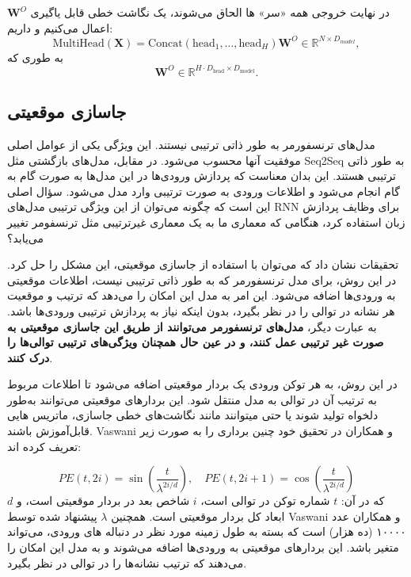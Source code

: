 در نهایت خروجی همه «سر» ها الحاق می‌شوند، یک نگاشت خطی قابل یاگیری
$\mathbf{W}^O$
اعمال می‌کنیم و داریم:
$$
\text{MultiHead}(\mathbf{X}) = \text{Concat}(\text{head}_1, \dots, \text{head}_H) \mathbf{W}^O \in \mathbb{R}^{N \times D_{model}},
$$
به طوری که
$$
\mathbf{W}^O \in \mathbb{R}^{H \cdot D_{\text{head}} \times D_{\text{model}}}.
$$

\subsection{جاسازی موقعیتی}

مدل‌های ترنسفورمر به طور ذاتی ترتیبی نیستند. این ویژگی یکی از عوامل اصلی موفقیت آنها محسوب می‌شود. در مقابل، مدل‌های بازگشتی مثل Seq2Seq به طور ذاتی ترتیبی هستند. این بدان معناست که پردازش ورودی‌ها در این مدل‌ها به صورت گام به گام انجام می‌شود و اطلاعات ورودی به صورت ترتیبی وارد مدل می‌شود. سؤال اصلی این است که چگونه می‌توان از این ویژگی ترتیبی مدل‌های RNN برای وظایف پردازش زبان استفاده کرد، هنگامی که معماری ما به یک معماری غیرترتیبی مثل ترنسفومر تغییر می‌یابد؟

تحقیقات نشان داد که می‌توان با استفاده از جاسازی موقعیتی، این مشکل را حل کرد. در این روش، برای مدل ترنسفورمر که به طور ذاتی ترتیبی نیست، اطلاعات موقعیتی به ورودی‌ها اضافه می‌شود. این امر به مدل این امکان را می‌دهد که ترتیب و موقعیت هر نشانه در توالی را در نظر بگیرد، بدون اینکه نیاز به پردازش ترتیبی ورودی‌ها باشد. به عبارت دیگر، \textbf{مدل‌های ترنسفورمر می‌توانند از طریق این جاسازی موقعیتی به صورت غیر ترتیبی عمل کنند، و در عین حال همچنان ویژگی‌های ترتیبی توالی‌ها را درک کنند}.

در این روش، به هر توکن ورودی یک بردار موقعیتی اضافه می‌شود تا اطلاعات مربوط به ترتیب آن در توالی به مدل منتقل شود. این بردارهای موقعیتی می‌توانند به‌طور دلخواه تولید شوند یا حتی میتوانند مانند نگاشت‌های خطی جاسازی، ماتریس هایی قابل‌آموزش باشند. Vaswani و همکاران در تحقیق خود چنین برداری را  به صورت زیر تعریف کرده اند:

\begin{equation}
PE(t, 2i) = \sin\left( \frac{t}{\lambda^{2i/d}} \right), \quad PE(t, 2i+1) = \cos\left( \frac{t}{\lambda^{2i/d}} \right)
\end{equation}
که در آن:
$t$ شماره توکن در توالی است،
$i$ شاخص بعد در بردار موقعیتی است،
و
$d$ ابعاد کل بردار موقعیتی است. 
همچنین $\lambda$ پیشنهاد شده توسط Vaswani و همکاران عدد ۱۰۰۰۰ (ده هزار) است که بسته به طول زمینه%
مورد نظر در دنباله های ورودی، می‌تواند متغیر باشد. این بردارهای موقعیتی به ورودی‌ها اضافه می‌شوند و به مدل این امکان را می‌دهند که ترتیب نشانه‌ها را در توالی در نظر بگیرد.

